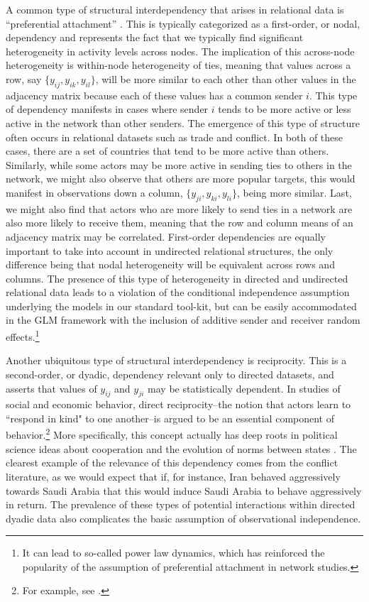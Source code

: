 \documentclass[12pt,pdflatex]{elsarticle}
\begin{document}
A common type of structural interdependency that arises in relational data is ``preferential attachment'' \citep{barabasi:reka:1999,reka:etal:1999}. This is typically categorized as a first-order, or nodal, dependency and represents the fact that we typically find significant heterogeneity in activity levels across nodes. The implication of this across-node heterogeneity is within-node heterogeneity of ties, meaning that values across a row, say $\{y_{ij},y_{ik},y_{il}\}$, will be more similar to each other than other values in the adjacency matrix because each of these values has a common sender $i$. This type of dependency manifests in cases where sender $i$ tends to be more active or less active in the network than other senders. The emergence of this type of structure often occurs in relational datasets such as trade and conflict. In both of these cases, there are a set of countries that tend to be more active than others. Similarly, while some actors may be more active in sending ties to others in the network, we might also observe that others are more popular targets, this would manifest in observations down a column, $\{y_{ji},y_{ki},y_{li}\}$, being more similar. Last, we might also find that actors who are more likely to send ties in a network are also more likely to receive them, meaning that the row and column means of an adjacency matrix may be correlated. First-order dependencies are equally important to take into account in undirected relational structures, the only difference being that nodal heterogeneity will be equivalent across rows and columns. The presence of this type of heterogeneity in directed and undirected relational data leads to a violation of the conditional independence assumption underlying the models in our standard tool-kit, but can be easily accommodated in the GLM framework with the inclusion of additive sender and receiver random effects.\footnote{It can lead to so-called power law dynamics, which has reinforced the popularity of the assumption of preferential attachment in network studies.}

Another ubiquitous type of structural interdependency is reciprocity. This is a second-order, or dyadic, dependency relevant only to directed datasets, and asserts that values of $y_{ij}$ and $y_{ji}$ may be statistically dependent. In studies of social and economic behavior, direct reciprocity--the notion that actors learn to ``respond in kind" to one another--is argued to be an essential component of behavior.\footnote{For example, see \cite{bolton:1998, cox:2007}.} More specifically, this concept actually has deep roots in political science ideas about cooperation and the evolution of norms between states \citep{richardson:1960,choucri:north:1972,keohane:1989,rajmaira:ward:1990,goldstein:freeman:1991,brandt:etal:2008}.  The clearest example of the relevance of this dependency comes from the conflict literature, as we would expect that if, for instance, Iran behaved aggressively towards Saudi Arabia that this would induce Saudi Arabia to behave aggressively in return. The prevalence of these types of potential interactions within directed dyadic data also complicates the basic assumption of observational independence.
\end{document}
